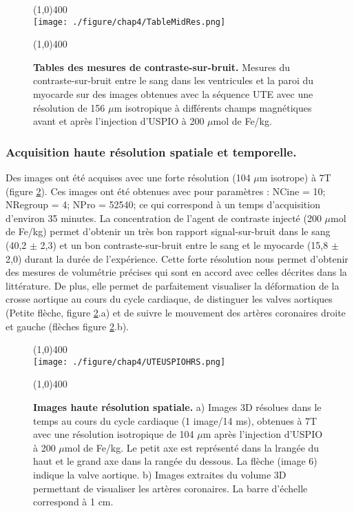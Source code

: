\begin{figure}[H]
\centering
\line(1,0){400} \\
\texttt{[image: ./figure/chap4/TableMidRes.png]}
\caption[Tables des mesures de contraste-sur-bruit.]{\label{fig:TableMidRes} \textbf{Tables des mesures de contraste-sur-bruit.} Mesures du contraste-sur-bruit entre le sang dans les ventricules et la paroi du myocarde sur des images obtenues avec la séquence UTE avec une résolution de 156 $\mu$m isotropique à différents champs magnétiques avant et après l'injection d'USPIO à 200 $\mu$mol de Fe/kg.}
\line(1,0){400} \\ 
\end{figure}

\subsubsection{Acquisition haute résolution spatiale et temporelle.}

Des images ont été acquises avec une forte résolution (104 $\mu$m isotrope) à 7T (figure \ref{fig:UTEUSPIOHRS}). Ces images ont été obtenues avec pour paramètres : NCine = 10; NRegroup = 4; NPro = 52540; ce qui correspond à un temps d'acquisition d'environ 35 minutes.
La concentration de l'agent de contraste injecté (200 $\mu$mol de Fe/kg) permet d'obtenir un très bon rapport signal-sur-bruit dans le sang (40,2 $\pm$ 2,3) et un bon contraste-sur-bruit entre le sang et le myocarde (15,8 $\pm$ 2,0) durant la durée de l'expérience.
Cette forte résolution nous permet d'obtenir des mesures de volumétrie précises qui sont en accord avec celles décrites dans la littérature. De plus, elle permet de parfaitement visualiser la déformation de la crosse aortique au cours du cycle cardiaque, de distinguer les valves aortiques (Petite flèche, figure \ref{fig:UTEUSPIOHRS}.a) et de suivre le mouvement des artères coronaires droite et gauche (flèches figure \ref{fig:UTEUSPIOHRS}.b).

\begin{figure}[H]
\centering
\line(1,0){400} \\
\texttt{[image: ./figure/chap4/UTEUSPIOHRS.png]}
\caption[Images haute résolution spatiale.]{\label{fig:UTEUSPIOHRS} \textbf{Images haute résolution spatiale.} a) Images 3D résolues dans le temps au cours du cycle cardiaque (1 image/14 ms), obtenues à 7T avec une résolution isotropique de 104 $\mu$m après l'injection d'USPIO à 200 $\mu$mol de Fe/kg. Le petit axe est représenté dans la lrangée du haut et le grand axe dans la rangée du dessous. La flèche (image 6) indique la valve aortique. b) Images extraites du volume 3D permettant de visualiser les artères coronaires. La barre d'échelle correspond à 1 cm.}
\line(1,0){400} \\ 
\end{figure}


